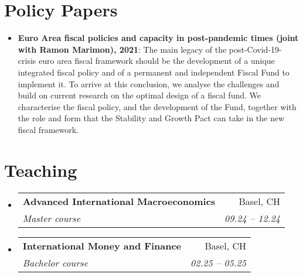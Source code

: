 \documentclass[letterpaper,11pt]{article}
\makeatletter
\newcommand{\resumeItem}[2]{
  \item\small{
    \textbf{#1}{: #2 \vspace{-2pt}}
  }
}
\newcommand{\resumeSubheading}[4]{
  \vspace{-1pt}\item
    \begin{tabular*}{0.97\textwidth}{l@{\extracolsep{\fill}}r}
      \textbf{#1} & #2 \\
      \textit{\small#3} & \textit{\small #4} \\
    \end{tabular*}\vspace{-5pt}
}
\newcommand{\resumeSubItem}[2]{\resumeItem{#1}{#2}\vspace{-1pt}}
\newcommand{\resumeSubHeadingListStart}{\begin{itemize}[leftmargin=*]}
\newcommand{\resumeSubHeadingListEnd}{\end{itemize}}
\makeatother
\begin{document}
\section{Policy Papers}
\resumeSubHeadingListStart
\resumeSubItem{Euro Area fiscal policies and capacity in post-pandemic times (joint with Ramon Marimon), 2021}{ \justifying The main legacy of the post-Covid-19-crisis euro area fiscal framework should be the development of a unique integrated fiscal policy and of a permanent and independent Fiscal Fund to implement it. To arrive at this conclusion, we analyse the challenges and build on current research on the optimal design of a fiscal fund. We characterise the fiscal policy, and the development of the Fund, together with the role and form that the Stability and Growth Pact can take in the new fiscal framework.}
\resumeSubHeadingListEnd


\section{Teaching}
  \resumeSubHeadingListStart
    
    \resumeSubheading
    {Advanced International Macroeconomics}{Basel, CH}
    {Master course}{09.24 -- 12.24}
      
       \resumeSubheading
    {International Money and Finance}{Basel, CH}
    {Bachelor course}{02.25 -- 05.25}

\resumeSubHeadingListEnd

  
  
      


\end{document}
